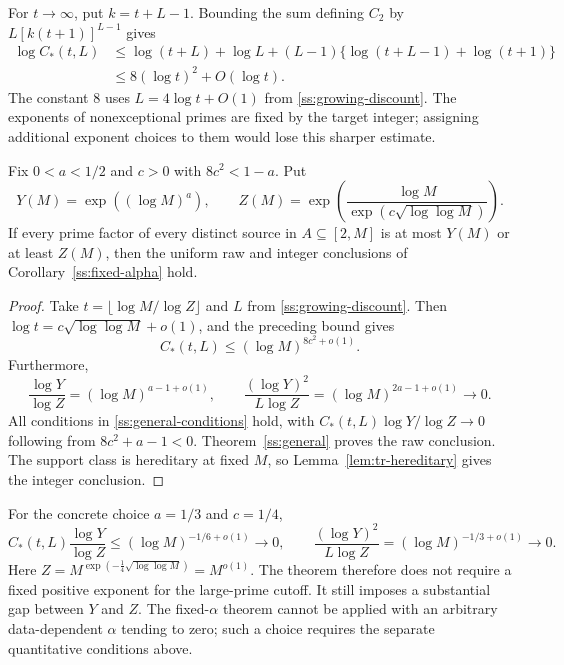 For $t\to\infty$, put $k=t+L-1$. Bounding the sum defining $C_2$ by
$L[k(t+1)]^{L-1}$ gives
\[
 \begin{split}
 \log C_*(t,L)
 &\le\log(t+L)+\log L
       +(L-1)\{\log(t+L-1)+\log(t+1)\}\\
 &\le8(\log t)^2+O(\log t).
 \end{split}
\]
The constant $8$ uses $L=4\log t+O(1)$ from
\eqref{ss:growing-discount}. The exponents of nonexceptional primes
are fixed by the target integer; assigning additional exponent choices
to them would lose this sharper estimate.

\begin{corollary}
\label{ss:subpolynomial}
Fix $0<a<1/2$ and $c>0$ with $8c^2<1-a$. Put
\[
 Y(M)=\exp((\log M)^a),\qquad
 Z(M)=\exp\left(\frac{\log M}
                        {\exp(c\sqrt{\log\log M})}\right).
 \]
If every prime factor of every distinct source in $A\subseteq[2,M]$
is at most $Y(M)$ or at least $Z(M)$, then the uniform raw and
integer conclusions of Corollary~\ref{ss:fixed-alpha} hold.
\end{corollary}

\begin{proof}
Take $t=\lfloor\log M/\log Z\rfloor$ and $L$ from
\eqref{ss:growing-discount}. Then
$\log t=c\sqrt{\log\log M}+o(1)$, and the preceding bound gives
\[
 C_*(t,L)\le(\log M)^{8c^2+o(1)}.
 \]
Furthermore,
\[
 \frac{\log Y}{\log Z}=(\log M)^{a-1+o(1)},\qquad
 \frac{(\log Y)^2}{L\log Z}
       =(\log M)^{2a-1+o(1)}\longrightarrow0.
 \]
All conditions in \eqref{ss:general-conditions} hold, with
$C_*(t,L)\log Y/\log Z\to0$ following from $8c^2+a-1<0$.
Theorem~\ref{ss:general} proves the raw conclusion.
The support class is hereditary at fixed $M$, so
Lemma~\ref{lem:tr-hereditary} gives the integer conclusion.
\end{proof}

For the concrete choice $a=1/3$ and $c=1/4$,
\[
 C_*(t,L)\frac{\log Y}{\log Z}
 \le(\log M)^{-1/6+o(1)}\to0,\qquad
 \frac{(\log Y)^2}{L\log Z}
       =(\log M)^{-1/3+o(1)}\to0.
 \]
Here
$Z=M^{\exp(-\frac14\sqrt{\log\log M})}=M^{o(1)}$.
The theorem therefore does not require a fixed positive exponent
for the large-prime cutoff. It still imposes a substantial gap
between $Y$ and $Z$. The fixed-$\alpha$ theorem cannot be applied
with an arbitrary data-dependent $\alpha$ tending to zero; such
a choice requires the separate quantitative conditions above.
